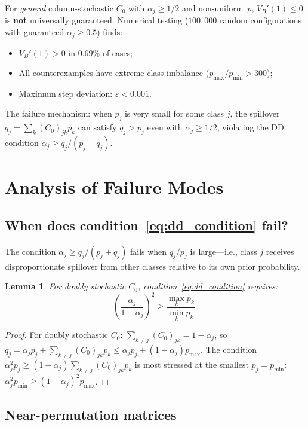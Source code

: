 \documentclass[11pt]{article}
\newtheorem{lemma}[theorem]{Lemma}
\begin{document}
For \emph{general} column-stochastic $C_0$ with $\alpha_j \geq 1/2$ and non-uniform~$p$,
$V_B'(1) \leq 0$ is \textbf{not} universally guaranteed.
Numerical testing ($100{,}000$ random configurations with guaranteed $\alpha_j \geq 0.5$) finds:
\begin{itemize}
\item $V_B'(1) > 0$ in $0.69\%$ of cases;
\item All counterexamples have extreme class imbalance ($p_{\max}/p_{\min} > 300$);
\item Maximum step deviation: $\varepsilon < 0.001$.
\end{itemize}

The failure mechanism: when $p_j$ is very small for some class $j$,
the spillover $q_j = \sum_k (C_0)_{jk} p_k$ can satisfy $q_j > p_j$
even with $\alpha_j \geq 1/2$,
violating the DD condition $\alpha_j \geq q_j/(p_j + q_j)$.

\section{Analysis of Failure Modes}

\subsection{When does condition~\eqref{eq:dd_condition} fail?}

The condition $\alpha_j \geq q_j/(p_j + q_j)$ fails when $q_j/p_j$ is large---i.e.,
class $j$ receives disproportionate spillover from other classes relative to its own prior probability.

\begin{lemma}
\label{lem:dd_failure}
For doubly stochastic $C_0$, condition~\eqref{eq:dd_condition} requires:
\[
  \left(\frac{\alpha_j}{1-\alpha_j}\right)^2 \geq \frac{\max_k p_k}{\min_k p_k}.
\]
\end{lemma}

\begin{proof}
For doubly stochastic $C_0$: $\sum_{k\neq j}(C_0)_{jk} = 1-\alpha_j$, so
$q_j = \alpha_j p_j + \sum_{k\neq j}(C_0)_{jk}p_k \leq \alpha_j p_j + (1-\alpha_j)p_{\max}$.
The condition $\alpha_j^2 p_j \geq (1-\alpha_j)\sum_{k\neq j}(C_0)_{jk}p_k$ is most stressed
at the smallest $p_j = p_{\min}$:
$\alpha_j^2 p_{\min} \geq (1-\alpha_j)^2 p_{\max}$.
\end{proof}

\subsection{Near-permutation matrices}
\end{document}
